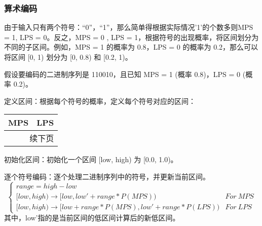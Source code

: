 \documentclass{/Users/hi/Study/template/code}
\begin{document}
\subsubsection{算术编码}
由于输入只有两个符号：“0”，“1”，那么简单得根据实际情况'1'的个数多则MPS = 1, LPS = 0。反之，MPS = 0 , LPS = 1，根据符号的出现概率，将区间划分为不同的子区间。例如，MPS = 1 的概率为 0.8，LPS = 0 的概率为 0.2，那么可以将区间 [0, 1) 划分为 [0, 0.8) 和 [0.2, 1)。

\begin{tcolorbox}
	\small
	假设要编码的二进制序列是 110010，且已知 MPS = 1 (概率 0.8)，LPS = 0 (概率 0.2)。
	\begin{serialNumber}
		\item 定义区间：根据每个符号的概率，定义每个符号对应的区间：
		\begin{longtable}{cc}
			\toprule
			\textbf{MPS} & \textbf{LPS} \\
			\midrule
			\endfirsthead
			\bottomrule()
			\multicolumn{2}{r}{续下页}
			\endfoot
			\bottomrule()
			\endlastfoot
			[0.0, 0.8)   & [0.8, 1.0)   \\
		\end{longtable}

		\item 初始化区间：初始化一个区间 [low, high) 为 [0.0, 1.0)。
		\item 逐个符号编码：逐个处理二进制序列中的符号，并更新当前区间。
		\begin{equation}
			\begin{cases}
				range = high - low                                                                    \\
				[low,high) \rightarrow  [low ,  low' + range * P( MPS ) )                 & For ~ MPS \\
				[low,high) \rightarrow  [low + range * P( MPS ) ,low' + range * P( LPS )) & For ~ LPS
			\end{cases}
		\end{equation}
		其中，low'指的是当前区间的低区间计算后的新低区间。


\end{serialNumber}
\end{tcolorbox}
\end{document}
